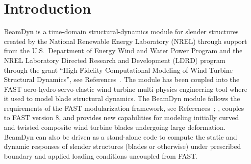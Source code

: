 \chapter{Introduction}
BeamDyn is a time-domain structural-dynamics module for slender structures created by the National Renewable Energy Laboratory (NREL) through support from the U.S.\ Department of Energy Wind and Water Power Program and the NREL Laboratory Directed Research and Development (LDRD) program through the grant ``High-Fidelity Computational Modeling of Wind-Turbine Structural Dynamics'', see References~\cite{Wang:SFE2013, Wang:GEBT2013,Wang:GEBT2014,Wang:2015}. The module has been coupled into the FAST aero-hydro-servo-elastic wind turbine multi-physics engineering tool where it used to model blade structural dynamics. 
The BeamDyn module follows the requirements of the FAST modularization framework, see References~\cite{Jonkman:2013}; \cite{Sprague:2013,Sprague:2014,website:FASTModularizationFramework}, couples to FAST version 8, and provides new capabilities for modeling initially curved and twisted composite wind turbine blades undergoing large deformation. 
BeamDyn can also be driven as a stand-alone code to compute the static and dynamic responses of slender structures (blades or otherwise) under prescribed boundary and applied loading conditions uncoupled from FAST.

